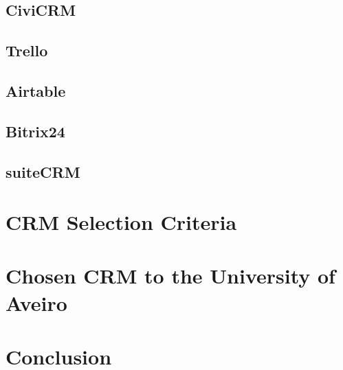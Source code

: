 \documentclass{article}
\begin{document}
\subsection{CiviCRM}

\subsection{Trello}

\subsection{Airtable}

\subsection{Bitrix24}

\subsection{suiteCRM}

\section{CRM Selection Criteria}

\section{Chosen CRM to the University of Aveiro}




\section{Conclusion}


\nocite{*}
\printbibliography
\end{document}
